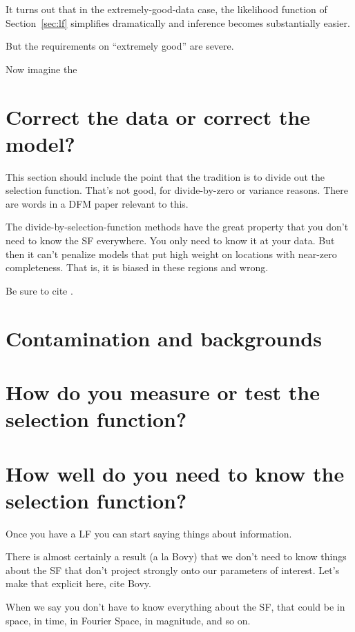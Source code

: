 \documentclass[modern]{aastex62}
\newcommand{\sectionname}{Section}
\begin{document}
It turns out that in the extremely-good-data case, the likelihood
function of \sectionname~\ref{sec:lf} simplifies dramatically and
inference becomes substantially easier.

But the requirements on ``extremely good'' are severe.

Now imagine the 

\section{Correct the data or correct the model?}\label{sec:correct}

This section should include the point that the tradition is to divide out
the selection function. That's not good, for divide-by-zero or variance
reasons. There are words in a DFM paper relevant to this.

The divide-by-selection-function methods have the great property that you don't need
to know the SF everywhere. You only need to know it at your data. But then
it can't penalize models that put high weight on locations with near-zero
completeness. That is, it is biased in these regions and wrong.

Be sure to cite \citet{blogpost}.

\section{Contamination and backgrounds}\label{sec:bg}

\section{How do you measure or test the selection function?}\label{sec:estimate}

\section{How well do you need to know the selection function?}\label{sec:quality}

Once you have a LF you can start saying things about information.

There is almost certainly a result (a la Bovy) that we don't need to know
things about the SF that don't project strongly onto our parameters of interest.
Let's make that explicit here, cite Bovy.

When we say you don't have to know everything about the SF, that could be
in space, in time, in Fourier Space, in magnitude, and so on.
\end{document}
